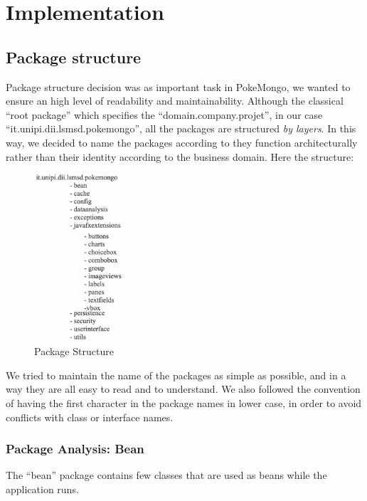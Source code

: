 \section{Implementation}
\subsection{Package structure}
Package structure decision was as important task in PokeMongo, we wanted to ensure an high level of readability and maintainability.
Although the classical “root package” which specifies the “domain.company.projet”, in our case “it.unipi.dii.lsmsd.pokemongo”, all the packages are structured \textit{by layers}. In this way, we decided to name the packages according to they function architecturally rather than their identity according to the business domain. Here the structure: 

\begin{figure}[H]
	\centering
	\includegraphics[width= 0.3\textwidth]{img/package_structure.png}
	\caption{Package Structure}
\end{figure}

We tried to maintain the name of the packages as simple as possible, and in a way they are all easy to read and to understand.
We also followed the convention of having the first character in the package names in lower case, in order to avoid conflicts with class or interface names.

\subsubsection{Package Analysis: Bean}
The “bean” package contains few classes that are used as beans while the application runs.


